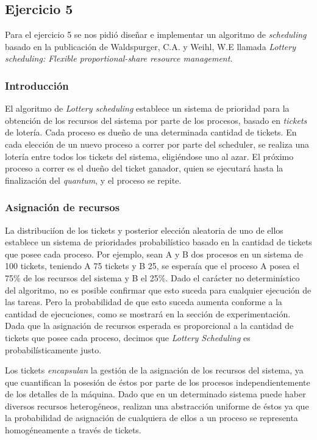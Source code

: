 \subsection{Ejercicio 5}

Para el ejercicio 5 se nos pidi\'o dise\~nar e implementar un algoritmo de \textit{scheduling} basado en la publicaci\'on de Waldspurger, C.A. y Weihl, W.E llamada \textit{Lottery scheduling: Flexible proportional-share resource management}.

\subsubsection{Introducci\'on}

El algoritmo de \textit{Lottery scheduling} establece un sistema de prioridad para la obtenci\'on de los recursos del sistema por parte de los procesos, basado en \textit{tickets} de loter\'ia. Cada proceso es due\~no de una determinada cantidad de tickets. En cada elecci\'on de un nuevo proceso a correr por parte del scheduler, se realiza una loter\'ia entre todos los tickets del sistema, eligi\'endose uno al azar. El pr\'oximo proceso a correr es el due\~no del ticket ganador, quien se ejecutar\'a hasta la finalizaci\'on del \textit{quantum}, y el proceso se repite.

\subsubsection{Asignaci\'on de recursos}

La distribuci\'ion de los tickets y posterior elecci\'on aleatoria de uno de ellos establece un sistema de prioridades probabil\'istico basado en la cantidad de tickets que posee cada proceso. Por ejemplo, sean A y B dos procesos en un sistema de 100 tickets, teniendo A 75 tickets y B 25, se espera\'ia que el proceso A posea el 75\% de los recursos del sistema y B el 25\%. Dado el car\'acter no determin\'istico del algoritmo, no es posible confirmar que esto suceda para cualquier ejecuci\'on de las tareas. Pero la probabilidad de que esto suceda aumenta conforme a la cantidad de ejecuciones, como se mostrar\'a en la secci\'on de experimentaci\'on. Dada que la asignaci\'on de recursos esperada es proporcional a la cantidad de tickets que posee cada proceso, decimos que \textit{Lottery Scheduling} es probabil\'isticamente justo.

Los tickets \textit{encapsulan} la gesti\'on de la asignaci\'on de los recursos del sistema, ya que cuantifican la posesi\'on de \'estos por parte de los procesos independientemente de los detalles de la m\'aquina. Dado que en un determinado sistema puede haber diversos recursos heterog\'eneos, realizan una abstracci\'on uniforme de \'estos ya que la probabilidad de asignaci\'on de cualquiera de ellos a un proceso se representa homog\'eneamente a trav\'es de tickets. 

